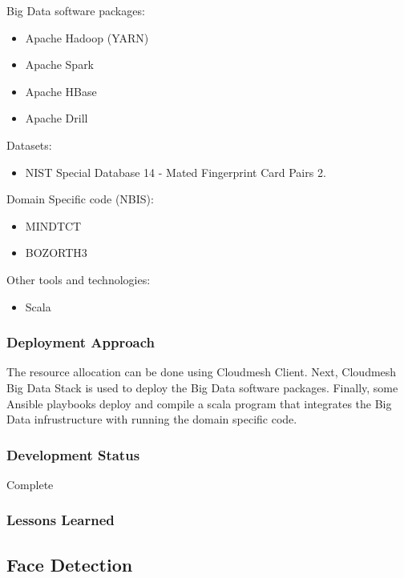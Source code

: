 \documentclass[9pt,twocolumn,twoside]{styles/osajnl}
\begin{document}
Big Data software packages:

\begin{itemize}
\item Apache Hadoop (YARN)
\item Apache Spark
\item Apache HBase
\item Apache Drill
\end{itemize}

Datasets:
\begin{itemize}
\item NIST Special Database 14 - Mated Fingerprint Card Pairs 2.
\end{itemize}

Domain Specific code (NBIS):
\begin{itemize}
\item MINDTCT
\item BOZORTH3
\end{itemize}


Other tools and technologies:
\begin{itemize}
\item Scala
\end{itemize}

\subsubsection{Deployment Approach}

The resource allocation can be done using Cloudmesh Client.
Next, Cloudmesh Big Data Stack is used to deploy the Big Data software packages.
Finally, some Ansible playbooks deploy and compile a scala program that integrates the Big Data infrustructure with running the domain specific code.

\subsubsection{Development Status}

Complete



\subsubsection{Lessons Learned}

\subsection{Face Detection}
\end{document}
